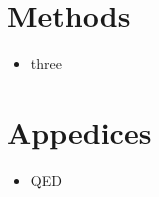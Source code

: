 \documentclass[12pt,one column]{article}
\begin{document}
\section*{Methods}
\begin{itemize}
	\item three
\end{itemize}




\section*{Appedices}
\begin{itemize}
	\item QED
\end{itemize}
\end{document}
